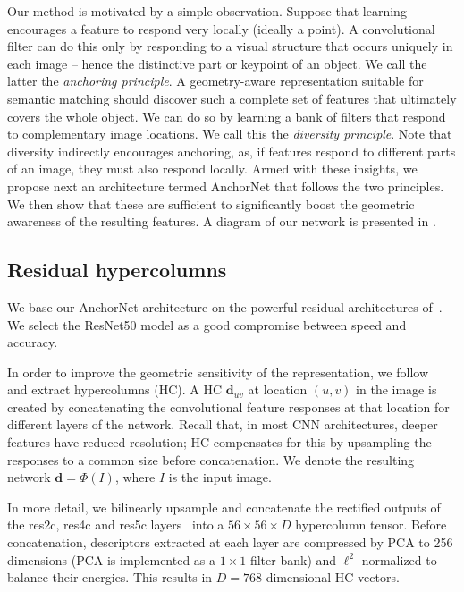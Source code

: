 \documentclass[10pt,twocolumn,letterpaper]{article}
\begin{document}
Our method is motivated by a simple observation. Suppose that learning encourages a feature to respond very locally (ideally a point). 
A convolutional filter can do this only by responding to a visual structure that occurs uniquely in each image -- hence the distinctive part or keypoint of an object. We call the latter the \emph{anchoring principle}. A geometry-aware representation suitable for semantic matching should discover such a complete set of features that ultimately covers the whole object. We can do so by learning a bank of filters that respond to complementary image locations. We call this the \emph{diversity principle}. Note that diversity indirectly encourages anchoring, as, if features respond to different parts of an image, they must also respond locally.
Armed with these insights, we propose next an architecture termed AnchorNet that follows the two principles. We then show that these are sufficient to significantly boost the geometric awareness of the resulting features. A diagram of our network is presented in .

\subsection{Residual hypercolumns}\label{s:hc}

We base our AnchorNet architecture on the powerful residual architectures of~\cite{he2015deep}. We select the ResNet50 model as a good compromise between speed and accuracy.

In order to improve the geometric sensitivity of the representation, we follow~\cite{hariharan15hypercolumns} and extract hypercolumns (HC). A HC $\mathbf{d}_{uv}$ at location $(u,v)$ in the image is created by concatenating the convolutional feature responses at that location for different layers of the network. 
Recall that, in most CNN architectures, deeper features have reduced resolution; HC compensates for this by upsampling the responses to a common size before concatenation. We denote the resulting network $\mathbf{d}=\Phi(I)$, where $I$ is the input image.

In more detail, we bilinearly upsample and concatenate the rectified outputs of the res2c, res4c and res5c layers~\cite{he2015deep} into a $56 \times 56 \times D$ hypercolumn tensor. Before concatenation, descriptors extracted at each layer are compressed by PCA to 256 dimensions (PCA is implemented as a $1\times 1$ filter bank) and $\ell^2$ normalized to balance their energies. This results in $D=768$ dimensional HC vectors. %
\end{document}
